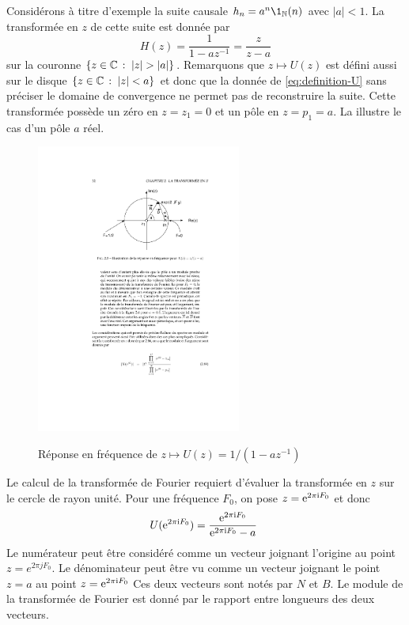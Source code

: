 Consid\'{e}rons  à  titre d'exemple la suite causale  $h_n=a^{n}\1_\nset(n)$ avec $|a|<1$. La transformée en $z$ de cette suite est donnée par
\begin{equation}
\label{eq:definition-U}
H(z)=\frac{1}{1-az^{-1}} = \frac{z}{z-a}
\end{equation}
sur la couronne $\ensemble{z \in \cset}{|z|>|a|}$. Remarquons que $z \mapsto U(z)$ est défini aussi sur le disque $\left\{z \in \mathbb{C}\,:\; |z|< a\right\}$ et donc que la donnée de \eqref{eq:definition-U} sans préciser le domaine de convergence ne permet pas de reconstruire la suite. 
Cette transform\'{e}e poss\`{e}de un z\'{e}ro en $z=z_1=0$ et un p\^{o}le en $z=p_{1}=a$. La  illustre le cas d'un p\^{o}le
$a$ r\'{e}el. 
\begin{figure}
  \centering
  \includegraphics[width=0.6\textwidth]{Figures/FigMignotte-1}\\
  \caption{Réponse en fréquence de $z \mapsto U(z)= 1/(1-az^{-1})$}\label{fig:FigMignotte-1}
\end{figure}

Le calcul de la transform\'{e}e de Fourier requiert d'\'{e}valuer la transform\'{e}e en $z$ sur le cercle de rayon unit\'{e}. Pour une fr\'{e}quence
$F_{0}$, on pose $z=\mathrm{e}^{2\pi \mathrm{i} F_{0}}$ et donc
$$
U(\rme^{2\pi  \rmi F_{0}})=\frac{\rme^{2\pi \rmi F_{0}}}{\rme^{2\pi  \rmi F_{0}}-a}\ 
$$
Le num\'{e}rateur peut \^{e}tre consid\'{e}r\'{e} comme un vecteur joignant l'origine au point $z=e^{2\pi jF_{0}}$. Le d\'{e}nominateur peut \^{e}tre vu comme un
vecteur joignant le point $z=a$ au point $z=\mathrm{e}^{2\pi  \mathrm{i} F_{0}}$ Ces deux vecteurs sont not\'{e}s par $N$ et $B$. Le module de la transform\'{e}e de Fourier est donn\'{e} par le rapport entre longueurs des deux vecteurs.

